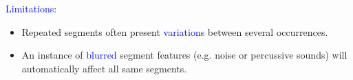 \documentclass[12pt]{beamer}
\begin{document}
\begin{frame}
\begin{columns}[c]
\begin{column}{0.5\textwidth} 
\textcolor{blue}{Limitations}:
\begin{itemize}	
	\item Repeated segments often present \textcolor{blue}{variations} between several occurrences. 
	\item An instance of \textcolor{blue}{blurred} segment features (e.g. noise or percussive sounds) will automatically affect all same segments.
\end{itemize}
\end{column} 

\end{columns} 



\end{frame}
\end{document}
